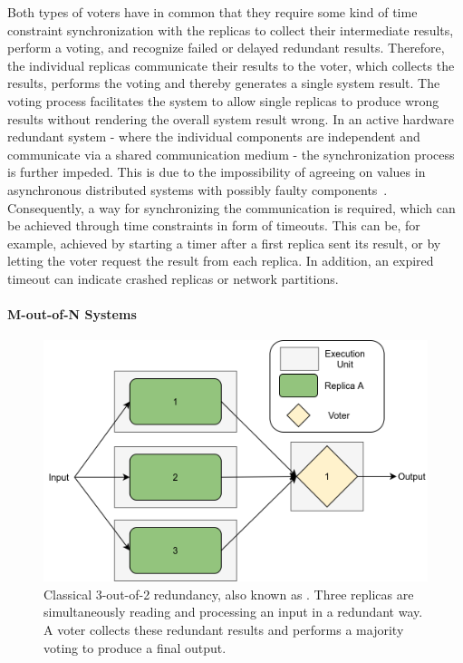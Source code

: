 Both types of voters have in common that they require some kind of time constraint synchronization with the replicas to collect their intermediate results, perform a voting, and recognize failed or delayed redundant results.
Therefore, the individual replicas communicate their results to the voter, which collects the results, performs the voting and thereby generates a single system result.
The voting process facilitates the system to allow single replicas to produce wrong results without rendering the overall system result wrong.
In an active hardware redundant system - where the individual components are independent and communicate via a shared communication medium - the synchronization process is further impeded.
This is due to the impossibility of agreeing on values in asynchronous distributed systems with possibly faulty components~\cite{FLPProblemConsensus}.
Consequently, a way for synchronizing the communication is required, which can be achieved through time constraints in form of timeouts.
This can be, for example, achieved by starting a timer after a first replica sent its result, or by letting the voter request the result from each replica.
In addition, an expired timeout can indicate crashed replicas or network partitions.

\paragraph{M-out-of-N Systems}
\begin{figure}[!hb]
	\centering
	\includegraphics[width=0.75\linewidth]{images/Classical2OO3}
	\caption{Classical 3-out-of-2 redundancy, also known as . Three replicas are simultaneously reading and processing an input in a redundant way. A voter collects these redundant results and performs a majority voting to produce a final output.}
	\label{fig:Classical2OO3}
\end{figure}

